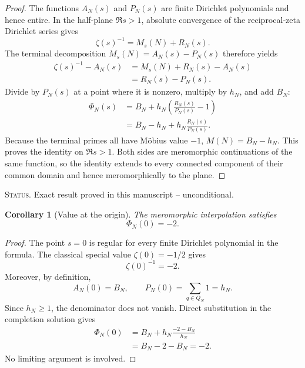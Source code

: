 \documentclass[11pt]{amsart}
\numberwithin{equation}{section}
\theoremstyle{plain}
\newtheorem{corollary}[theorem]{Corollary}
\theoremstyle{definition}
\theoremstyle{remark}
\newcommand{\1}{\mathbf{1}}
\newcommand{\statusnote}[1]{%
  \par\smallskip\noindent
  \begingroup\footnotesize\textsc{Status.} #1\endgroup
  \par\smallskip}
\begin{document}
\begin{proof}
The functions \(A_N(s)\) and \(P_N(s)\) are finite Dirichlet polynomials
and hence entire.  In the half-plane \(\Re s>1\), absolute convergence of
the reciprocal-zeta Dirichlet series gives
\begin{equation}
\zeta(s)^{-1}
=
M_s(N)+R_N(s).
\label{eq:canonical_proof_reciprocal_split}
\end{equation}
The terminal decomposition \(M_s(N)=A_N(s)-P_N(s)\) therefore yields
\begin{align}
\zeta(s)^{-1}-A_N(s)
&=
M_s(N)+R_N(s)-A_N(s)
\label{eq:canonical_proof_step_one}
\\
&=
R_N(s)-P_N(s).
\label{eq:canonical_proof_step_two}
\end{align}
Divide by \(P_N(s)\) at a point where it is nonzero, multiply by \(h_N\),
and add \(B_N\):
\begin{align}
\Phi_N(s)
&=
B_N+h_N\left(\frac{R_N(s)}{P_N(s)}-1\right)
\label{eq:canonical_proof_step_three}
\\
&=
B_N-h_N+h_N\frac{R_N(s)}{P_N(s)}.
\label{eq:canonical_proof_step_four}
\end{align}
Because the terminal primes all have Möbius value \(-1\),
\(M(N)=B_N-h_N\).  This proves the identity on \(\Re s>1\).  Both sides
are meromorphic continuations of the same function, so the identity extends
to every connected component of their common domain and hence
meromorphically to the plane.
\end{proof}

\statusnote{Exact result proved in this manuscript -- unconditional.}
\begin{corollary}[Value at the origin]
\label{cor:Phi_origin}
The meromorphic interpolation satisfies
\begin{equation}
\boxed{\Phi_N(0)=-2.}
\label{eq:Phi_origin}
\end{equation}
\end{corollary}

\begin{proof}
The point \(s=0\) is regular for every finite Dirichlet polynomial in the
formula.  The classical special value \(\zeta(0)=-1/2\) gives
\begin{equation}
\zeta(0)^{-1}=-2.
\label{eq:origin_inverse_zeta}
\end{equation}
Moreover, by definition,
\begin{equation}
A_N(0)=B_N,
\qquad
P_N(0)=\sum_{q\in Q_N}1=h_N.
\label{eq:origin_finite_values}
\end{equation}
Since \(h_N\geq1\), the denominator does not vanish.  Direct substitution
in the completion solution gives
\begin{align}
\Phi_N(0)
&=
B_N+h_N\frac{-2-B_N}{h_N}
\label{eq:origin_substitution_detailed}
\\
&=
B_N-2-B_N
=-2.
\label{eq:origin_cancellation_detailed}
\end{align}
No limiting argument is involved.
\end{proof}
\end{document}
